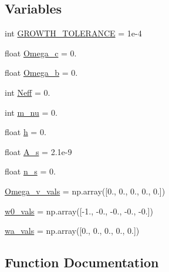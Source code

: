 \subsection*{Variables}
\begin{DoxyCompactItemize}
\item 
int \mbox{\hyperlink{namespaceccl__test__growth_a2cd407292b4e5880bcd20380e4378960}{G\+R\+O\+W\+T\+H\+\_\+\+T\+O\+L\+E\+R\+A\+N\+CE}} = 1e-\/4
\item 
float \mbox{\hyperlink{namespaceccl__test__growth_a7008fc5d2176f6e0f875c5e6c709114d}{Omega\+\_\+c}} = 0.
\item 
float \mbox{\hyperlink{namespaceccl__test__growth_a46cff936ff2e830c74bd0b7d5d452f26}{Omega\+\_\+b}} = 0.
\item 
int \mbox{\hyperlink{namespaceccl__test__growth_a45bdb99d0f699c606d3d9161a75a0c79}{Neff}} = 0.
\item 
int \mbox{\hyperlink{namespaceccl__test__growth_aba28f9096317c4a2166ec5fd9a483373}{m\+\_\+nu}} = 0.
\item 
float \mbox{\hyperlink{namespaceccl__test__growth_a6fb889bb34b68e7f24fb4dba826884be}{h}} = 0.
\item 
float \mbox{\hyperlink{namespaceccl__test__growth_ae7c040656adf879c79a4f0266f35e7e7}{A\+\_\+s}} = 2.\+1e-\/9
\item 
float \mbox{\hyperlink{namespaceccl__test__growth_aefd3ff5bb306877374f5351d2df5f8fc}{n\+\_\+s}} = 0.
\item 
\mbox{\hyperlink{namespaceccl__test__growth_a4abfc4891b595cd9d894d978c4ce89f0}{Omega\+\_\+v\+\_\+vals}} = np.\+array(\mbox{[}0., 0., 0., 0., 0.\mbox{]})
\item 
\mbox{\hyperlink{namespaceccl__test__growth_ab846706326cba20d21f5963cbe5af568}{w0\+\_\+vals}} = np.\+array(\mbox{[}-\/1., -\/0., -\/0., -\/0., -\/0.\mbox{]})
\item 
\mbox{\hyperlink{namespaceccl__test__growth_a3b5a7ad847705c7a11bd75b81a268e5f}{wa\+\_\+vals}} = np.\+array(\mbox{[}0., 0., 0., 0., 0.\mbox{]})
\end{DoxyCompactItemize}


\subsection{Function Documentation}
\mbox{\label{namespaceccl__test__growth_aba020a4d3272ed9d9b03b9c6a1ffb452}} 
